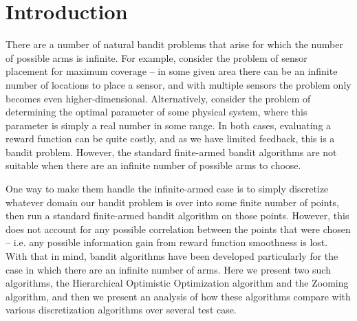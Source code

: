 \section{Introduction}
There are a number of natural bandit problems that arise for which the
number of possible arms is infinite.  For example, consider the problem of
sensor placement for maximum coverage -- in some given area there can be an
infinite number of locations to place a sensor, and with multiple sensors the
problem only becomes even higher-dimensional.  Alternatively, consider the
problem of determining the optimal parameter of some physical system, where
this parameter is simply a real number in some range.  In both cases,
evaluating a reward function can be quite costly, and as we have limited
feedback, this is a bandit problem.  However, the standard finite-armed
bandit algorithms are not suitable when there are an infinite number of
possible arms to choose.

One way to make them handle the infinite-armed
case is to simply discretize whatever domain our bandit problem is over
into some finite number of points, then run a standard finite-armed bandit
algorithm on those points.  However, this does not account for any
possible correlation between the points that were chosen -- i.e. any possible
information gain from reward function smoothness is lost.  With that in
mind, bandit algorithms have been developed particularly for the case in
which there are an infinite number of arms.  Here we present two such
algorithms, the Hierarchical Optimistic Optimization algorithm and the
Zooming algorithm, and then we present an analysis of how these algorithms
compare with various discretization algorithms over several test case.

